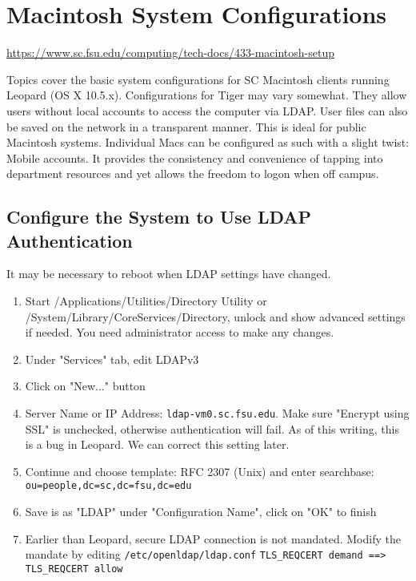 \documentclass[12pt,a4paper]{article}
\begin{document}
\section{Macintosh System Configurations}
\url{https://www.sc.fsu.edu/computing/tech-docs/433-macintosh-setup}

Topics cover the basic system configurations for SC Macintosh clients running Leopard (OS X 10.5.x). Configurations for Tiger may vary somewhat. They allow users without local accounts to access the computer via LDAP. User files can also be saved on the network in a transparent manner. This is ideal for public Macintosh systems. Individual Macs can be configured as such with a slight twist: Mobile accounts. It provides the consistency and convenience of tapping into department resources and yet allows the freedom to logon when off campus.

\subsection*{Configure the System to Use LDAP Authentication}
It may be necessary to reboot when LDAP settings have changed.
\begin{enumerate}
    \item Start /Applications/Utilities/Directory Utility or /System/Library/CoreServices/Directory, unlock and show advanced settings if needed. You need administrator access to make any changes.
    \item Under "Services" tab, edit LDAPv3
    \item Click on "New..." button
    \item Server Name or IP Address: \texttt{ldap-vm0.sc.fsu.edu}. Make sure "Encrypt using SSL" is unchecked, otherwise authentication will fail. As of this writing, this is a bug in Leopard. We can correct this setting later.
    \item Continue and choose template: RFC 2307 (Unix) and enter searchbase: \texttt{ou=people,dc=sc,dc=fsu,dc=edu}
    \item Save is as "LDAP" under "Configuration Name", click on "OK" to finish
    \item Earlier than Leopard, secure LDAP connection is not mandated. Modify the mandate by editing \texttt{/etc/openldap/ldap.conf}
    \texttt{TLS\_REQCERT demand ==> TLS\_REQCERT allow}
\end{enumerate}
\end{document}
